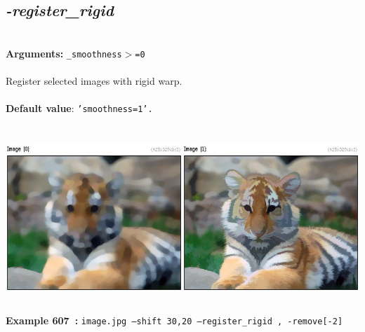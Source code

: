 \documentclass[a4paper,11pt,twoside]{book}
\begin{document}
\subsection{\emph{-register\_rigid} }\vspace*{-0.5em}
~\\\textbf{Arguments: } 
{\small \texttt{\_smoothness$>$=0}}\\~\\
Register selected images with rigid warp.
~\\~\\\textbf{Default value}: {\small \texttt{'smoothness=1'.}}
\begin{center}\includegraphics[keepaspectratio=true,height=7cm,width=\textwidth]{img/gmic_def607.jpg}\\
{\footnotesize \textbf{Example 607~:} \texttt{image.jpg --shift 30,20 --register\_rigid , -remove[-2]}}
\end{center}
\end{document}
